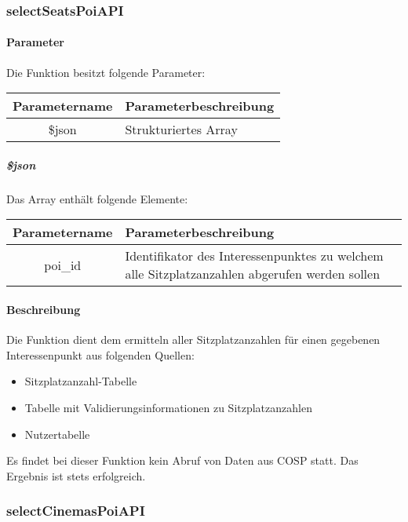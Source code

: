 \subsubsection{selectSeatsPoiAPI}
\paragraph{Parameter} Die Funktion besitzt folgende Parameter:
\begin{table}[H]
	\begin{tabular}{|c|p{11cm}|}
		\hline
		\textbf{Parametername} & \textbf{Parameterbeschreibung} \\ \hline
		\$json & Strukturiertes Array \\ \hline
	\end{tabular}
\end{table}
\subparagraph{\$json}Das Array enthält folgende Elemente:
\begin{table}[H]
	\begin{tabular}{|c|p{11cm}|}
		\hline
		\textbf{Parametername} & \textbf{Parameterbeschreibung} \\ \hline
		poi\_id & Identifikator des Interessenpunktes zu welchem alle Sitzplatzanzahlen abgerufen werden sollen \\ \hline
	\end{tabular}
\end{table}
\paragraph{Beschreibung} Die Funktion dient dem ermitteln aller Sitzplatzanzahlen für einen gegebenen Interessenpunkt aus folgenden Quellen:
\begin{itemize}
	\item Sitzplatzanzahl-Tabelle
	\item Tabelle mit Validierungsinformationen zu Sitzplatzanzahlen
	\item Nutzertabelle
\end{itemize}
Es findet bei dieser Funktion kein Abruf von Daten aus {\glqq COSP\grqq} statt. Das Ergebnis ist stets erfolgreich.
\subsubsection{selectCinemasPoiAPI}

